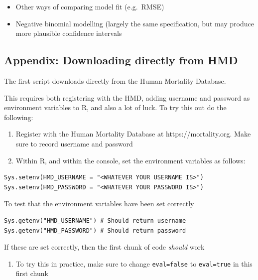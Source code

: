 \documentclass[
  letterpaper,
  DIV=11,
  numbers=noendperiod]{scrartcl}
\providecommand{\tightlist}{%
  \setlength{\itemsep}{0pt}\setlength{\parskip}{0pt}}\usepackage{longtable,booktabs,array}
\begin{document}
\begin{itemize}
\item
  Other ways of comparing model fit (e.g.~RMSE)
\item
  Negative binomial modelling (largely the same specification, but may
  produce more plausible confidence intervals
\end{itemize}

\hypertarget{appendix-downloading-directly-from-hmd}{%
\subsection{Appendix: Downloading directly from
HMD}\label{appendix-downloading-directly-from-hmd}}

The first script downloads directly from the Human Mortality Database.

This requires both registering with the HMD, adding username and
password as environment variables to R, and also a lot of luck. To try
this out do the following:

\begin{enumerate}
\def\labelenumi{\arabic{enumi}.}
\tightlist
\item
  Register with the Human Mortality Database at https://mortality.org.
  Make sure to record username and password
\item
  Within R, and within the console, set the environment variables as
  follows:
\end{enumerate}

\begin{verbatim}
Sys.setenv(HMD_USERNAME = "<WHATEVER YOUR USERNAME IS>")
Sys.setenv(HMD_PASSWORD = "<WHATEVER YOUR PASSWORD IS>")
\end{verbatim}

To test that the environment variables have been set correctly

\begin{verbatim}
Sys.getenv("HMD_USERNAME") # Should return username
Sys.getenv("HMD_PASSWORD") # Should return password
\end{verbatim}

If these are set correctly, then the first chunk of code \emph{should}
work

\begin{enumerate}
\def\labelenumi{\arabic{enumi}.}
\setcounter{enumi}{2}
\tightlist
\item
  To try this in practice, make sure to change \texttt{eval=false} to
  \texttt{eval=true} in this first chunk
\end{enumerate}
\end{document}
